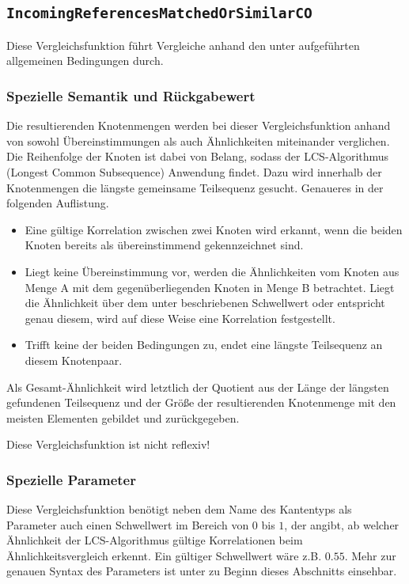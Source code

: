 \vskip20pt
%
%
\subsection{\texttt{IncomingReferencesMatchedOrSimilarCO}}
Diese Vergleichsfunktion führt Vergleiche anhand den unter\mylinebreak{} aufgeführten allgemeinen Bedingungen durch.

\subsubsection*{Spezielle Semantik und Rückgabewert}
Die resultierenden Knotenmengen werden bei dieser Vergleichsfunktion anhand von sowohl Übereinstimmungen als auch Ähnlichkeiten miteinander verglichen. Die Reihenfolge der Knoten ist dabei von Belang, sodass der LCS-Algorithmus (Longest Common Subsequence) Anwendung findet. Dazu wird innerhalb der Knotenmengen die längste gemeinsame Teilsequenz gesucht. Genaueres in der folgenden Auflistung.
\begin{itemize}
	\item Eine gültige Korrelation zwischen zwei Knoten wird erkannt, wenn die beiden Knoten bereits als übereinstimmend gekennzeichnet sind.
	\item Liegt keine Übereinstimmung vor, werden die Ähnlichkeiten vom Knoten aus Menge A mit dem gegenüberliegenden Knoten in Menge B betrachtet. Liegt die Ähnlichkeit über dem unter  beschriebenen Schwellwert oder entspricht genau diesem, wird auf diese Weise eine Korrelation festgestellt.
	\item Trifft keine der beiden Bedingungen zu, endet eine längste Teilsequenz an diesem Knotenpaar.
\end{itemize}

Als Gesamt-Ähnlichkeit wird letztlich der Quotient aus der Länge der längsten gefundenen Teilsequenz und der Größe der resultierenden Knotenmenge mit den meisten Elementen gebildet und zurückgegeben.

 Diese Vergleichsfunktion ist nicht reflexiv!

\subsubsection*{Spezielle Parameter}
Diese Vergleichsfunktion benötigt neben dem Name des Kantentyps als Parameter auch einen Schwellwert im Bereich von $0$ bis $1$, der angibt, ab welcher Ähnlichkeit der LCS-Algorithmus gültige Korrelationen beim Ähnlichkeitsvergleich erkennt. Ein gültiger Schwellwert wäre z.B. $0.55$. Mehr zur genauen Syntax des Parameters ist unter  zu Beginn dieses Abschnitts einsehbar.



